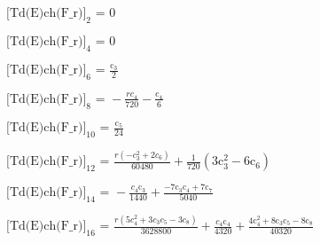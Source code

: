 \documentclass{article}
\newcommand{\unicode}[1]{{}}
\begin{document}
\noindent\(\text{[Td(E)ch(F$\_$r)]}_2\text{ = }0\)

\noindent\(\text{[Td(E)ch(F$\_$r)]}_4\text{ = }0\)

\noindent\(\text{[Td(E)ch(F$\_$r)]}_6\text{ = }\frac{\text{c$\unicode{02bc}$}_3}{2}\)

\noindent\(\text{[Td(E)ch(F$\_$r)]}_8\text{ = }-\frac{r c_4}{720}-\frac{\text{c$\unicode{02bc}$}_4}{6}\)

\noindent\(\text{[Td(E)ch(F$\_$r)]}_{10}\text{ = }\frac{\text{c$\unicode{02bc}$}_5}{24}\)

\noindent\(\text{[Td(E)ch(F$\_$r)]}_{12}\text{ = }\frac{r \left(-c_3^2+2 c_6\right)}{60480}+\frac{1}{720} \left(3 \text{c$\unicode{02bc}$}_3^2-6
\text{c$\unicode{02bc}$}_6\right)\)

\noindent\(\text{[Td(E)ch(F$\_$r)]}_{14}\text{ = }-\frac{c_4 \text{c$\unicode{02bc}$}_3}{1440}+\frac{-7 \text{c$\unicode{02bc}$}_3 \text{c$\unicode{02bc}$}_4+7
\text{c$\unicode{02bc}$}_7}{5040}\)

\noindent\(\text{[Td(E)ch(F$\_$r)]}_{16}\text{ = }\frac{r \left(5 c_4^2+3 c_3 c_5-3 c_8\right)}{3628800}+\frac{c_4 \text{c$\unicode{02bc}$}_4}{4320}+\frac{4
\text{c$\unicode{02bc}$}_4^2+8 \text{c$\unicode{02bc}$}_3 \text{c$\unicode{02bc}$}_5-8 \text{c$\unicode{02bc}$}_8}{40320}\)
\end{document}
